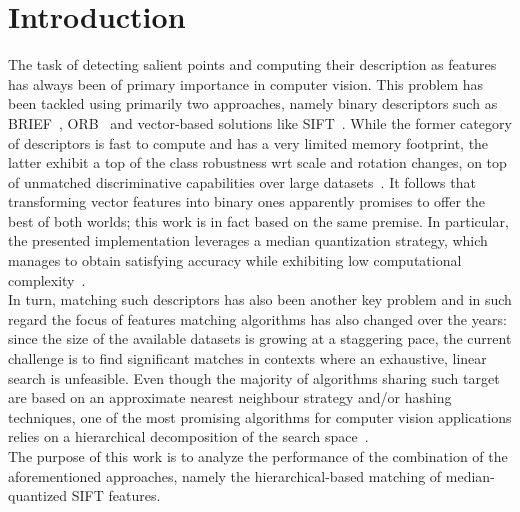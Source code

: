 \documentclass[a4paper, 12pt, oneside]{article}
\begin{document}
\section*{Introduction}
  The task of detecting salient points and computing their description as features has always been of primary importance in computer vision. This problem has been tackled using primarily two approaches, namely binary descriptors such as BRIEF~\cite{calonder2010brief}, ORB~\cite{rublee2011orb} and vector-based solutions like SIFT~\cite{lowe2004distinctive}. While the former category of descriptors is fast to compute and has a very limited memory footprint, the latter exhibit a top of the class robustness wrt scale and rotation changes, on top of unmatched discriminative capabilities over large datasets~\cite{grauman2005efficient, karami2017image}. It follows that transforming vector features into binary ones apparently promises to offer the best of both worlds; this work is in fact based on the same premise. In particular, the presented implementation leverages a median quantization strategy, which manages to obtain satisfying accuracy while exhibiting low computational complexity~\cite{peker2011binary}.\\
  In turn, matching such descriptors has also been another key problem and in such regard the focus of features matching algorithms has also changed over the years: since the size of the available datasets is growing at a staggering pace, the current challenge is to find significant matches in contexts where an exhaustive, linear search is unfeasible. Even though the majority of algorithms sharing such target are based on an approximate nearest neighbour strategy and/or hashing techniques, one of the most promising algorithms for computer vision applications relies on a hierarchical decomposition of the search space~\cite{muja2012fast}. \\
  The purpose of this work is to analyze the performance of the combination of the aforementioned approaches, namely the hierarchical-based matching of median-quantized SIFT features.
\end{document}

